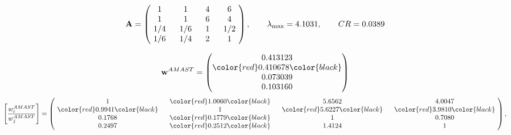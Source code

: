 \begin{example}
\begin{equation*}
\mathbf{A} =
\begin{pmatrix}
$\,\,$ 1 $\,\,$ & $\,\,$1$\,\,$ & $\,\,$4$\,\,$ & $\,\,$6 $\,\,$ \\
$\,\,$ 1 $\,\,$ & $\,\,$ 1 $\,\,$ & $\,\,$6$\,\,$ & $\,\,$4 $\,\,$ \\
$\,\,$ 1/4$\,\,$ & $\,\,$ 1/6$\,\,$ & $\,\,$ 1 $\,\,$ & $\,\,$ 1/2 $\,\,$ \\
$\,\,$ 1/6$\,\,$ & $\,\,$ 1/4$\,\,$ & $\,\,$2$\,\,$ & $\,\,$ 1  $\,\,$ \\
\end{pmatrix},
\qquad
\lambda_{\max} =
4.1031,
\qquad
CR = 0.0389
\end{equation*}

\begin{equation*}
\mathbf{w}^{AMAST} =
\begin{pmatrix}
0.413123\\
\color{red} 0.410678\color{black} \\
0.073039\\
0.103160
\end{pmatrix}\end{equation*}
\begin{equation*}
\left[ \frac{{w}^{AMAST}_i}{{w}^{AMAST}_j} \right] =
\begin{pmatrix}
$\,\,$ 1 $\,\,$ & $\,\,$\color{red} 1.0060\color{black} $\,\,$ & $\,\,$5.6562$\,\,$ & $\,\,$4.0047$\,\,$ \\
$\,\,$\color{red} 0.9941\color{black} $\,\,$ & $\,\,$ 1 $\,\,$ & $\,\,$\color{red} 5.6227\color{black} $\,\,$ & $\,\,$\color{red} 3.9810\color{black}   $\,\,$ \\
$\,\,$0.1768$\,\,$ & $\,\,$\color{red} 0.1779\color{black} $\,\,$ & $\,\,$ 1 $\,\,$ & $\,\,$0.7080 $\,\,$ \\
$\,\,$0.2497$\,\,$ & $\,\,$\color{red} 0.2512\color{black} $\,\,$ & $\,\,$1.4124$\,\,$ & $\,\,$ 1  $\,\,$ \\
\end{pmatrix},
\end{equation*}


\end{example}
